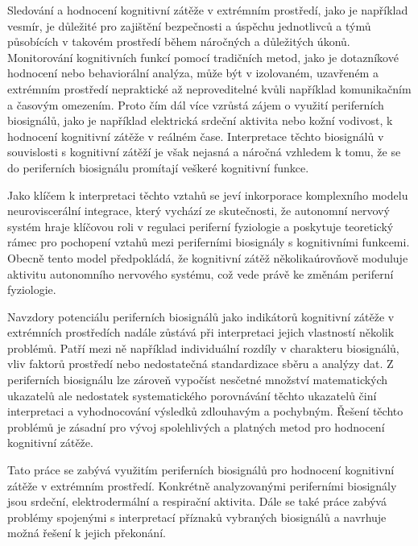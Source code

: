 Sledování a hodnocení kognitivní zátěže v extrémním prostředí, jako je například
vesmír, je důležité pro zajištění bezpečnosti a úspěchu jednotlivců a týmů
působících v takovém prostředí během náročných a důležitých úkonů. Monitorování
kognitivních funkcí pomocí tradičních metod, jako je dotazníkové hodnocení nebo
behaviorální analýza, může být v izolovaném, uzavřeném a extrémním prostředí
nepraktické až neproveditelné kvůli například komunikačním a časovým omezením.
Proto čím dál více vzrůstá zájem o využití periferních biosignálů, jako je
například elektrická srdeční aktivita nebo kožní vodivost, k hodnocení
kognitivní zátěže v reálném čase. Interpretace těchto biosignálů v souvislosti s
kognitivní zátěží je však nejasná a náročná vzhledem k tomu, že se do
periferních biosignálu promítají veškeré kognitivní funkce. 

Jako klíčem k interpretaci těchto vztahů se jeví inkorporace komplexního modelu
neuroviscerální integrace, který vychází ze skutečnosti, že autonomní nervový
systém hraje klíčovou roli v regulaci periferní fyziologie a poskytuje
teoretický rámec pro pochopení vztahů mezi periferními biosignály s kognitivními
funkcemi. Obecně tento model předpokládá, že kognitivní zátěž několikaúrovňově
moduluje aktivitu autonomního nervového systému, což vede právě ke změnám
periferní fyziologie.

Navzdory potenciálu periferních biosignálů jako indikátorů kognitivní zátěže v
extrémních prostředích nadále zůstává při interpretaci jejich vlastností několik
problémů. Patří mezi ně například individuální rozdíly v charakteru biosignálů,
vliv faktorů prostředí nebo nedostatečná standardizace sběru a analýzy dat. Z
periferních biosignálu lze zároveň vypočíst nesčetné množství matematických
ukazatelů ale nedostatek systematického porovnávání těchto ukazatelů činí
interpretaci a vyhodnocování výsledků zdlouhavým a pochybným. Řešení těchto
problémů je zásadní pro vývoj spolehlivých a platných metod pro hodnocení
kognitivní zátěže.

Tato práce se zabývá využitím periferních biosignálů pro hodnocení kognitivní
zátěže v extrémním prostředí. Konkrétně analyzovanými periferními biosignály
jsou srdeční, elektrodermální a respirační aktivita. Dále se také práce zabývá
problémy spojenými s interpretací příznaků vybraných biosignálů a navrhuje možná
řešení k jejich překonání.

